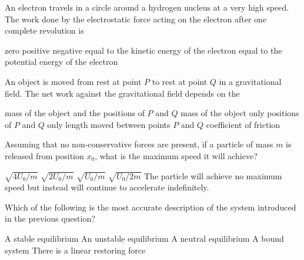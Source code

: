 \documentclass{../../../oss-apphys-exam}
\begin{document}
\begin{multicols*}{2}
\begin{questions}
    \question An electron travels in a circle around a hydrogen nucleus at a
    very high speed. The work done by the electrostatic force acting on the
    electron after one complete revolution is
    \begin{choices}
      \choice zero
      \choice positive
      \choice negative
      \choice equal to the kinetic energy of the electron
      \choice equal to the potential energy of the electron
    \end{choices}
    
    \question An object is moved from rest at point $P$ to rest at point $Q$ in
    a gravitational field. The net work against the gravitational field depends
    on the
    \begin{choices}
      \choice mass of the object and the positions of $P$ and $Q$
      \choice mass of the object only
      \choice positions of $P$ and $Q$ only
      \choice length moved between points $P$ and $Q$
      \choice coefficient of friction
    \end{choices}
    \columnbreak


    \question Assuming that no non-conservative forces are present, if a
    particle of mass $m$ is released from position $x_0$, what is the maximum
    speed it will achieve?
    \label{q:well1}
    \begin{choices}
      \choice $\sqrt{4U_0/m}$
      \choice $\sqrt{2U_0/m}$
      \choice $\sqrt{U_0/m}$
      \choice $\sqrt{U_0/2m}$
      \choice The particle will achieve no maximum speed but instead will
      continue to accelerate indefinitely.
    \end{choices}
    
    \question Which of the following is the most accurate description of the
    system introduced in the previous question?
    \label{q:well2}
    \begin{choices}
      \choice A stable equilibrium
      \choice An unstable equilibrium
      \choice A neutral equilibrium
      \choice A bound system
      \choice There is a linear restoring force
    \end{choices}
    

\end{questions}
\end{multicols*}
\end{document}
